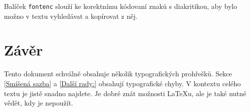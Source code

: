 \documentclass[a4paper,10pt,twocolumn]{article}
\begin{document}
Balíček  \verb|fontenc| slouží ke korektnímu kódovaní znaků s diakritikou, aby bylo možno v textu vyhledávat a kopírovat z něj.

\section{Závěr}
Tento dokument schválně obsahuje několik typografických prohřešků. Sekce \ref{Smíšená sazba} a \ref{Další rady:} obsahují typografické chyby. V kontextu celého textu je jistě snadno najdete. Je dobré znát možnosti \LaTeX u, ale je také nutné vědět, kdy je nepoužít.
\end{document}
